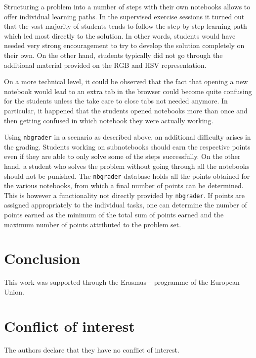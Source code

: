 \documentclass[twocolumn]{svjour3}          %
\begin{document}
Structuring a problem into a number of steps with their own notebooks allows to
offer individual learning paths. In the supervised exercise sessions it turned
out that the vast majority of students tends to follow the step-by-step
learning path which led most directly to the solution. In other words, students
would have needed very strong encouragement to try to develop the solution
completely on their own. On the other hand, students typically did not go through
the additional material provided on the RGB and HSV representation.

On a more technical level, it could be observed that the fact that opening a
new notebook would lead to an extra tab in the browser could become quite
confusing for the students unless the take care to close tabs not needed
anymore. In particular, it happened that the students opened notebooks more
than once and then getting confused in which notebook they were actually
working.

Using \texttt{nbgrader} in a scenario as described above, an additional
difficulty arises in the grading. Students working on subnotebooks should earn
the respective points even if they are able to only solve some of the steps
successfully. On the other hand, a student who solves the problem without going
through all the notebooks should not be punished. The \texttt{nbgrader}
database holds all the points obtained for the various notebooks, from which a
final number of points can be determined. This is however a functionality not
directly provided by \texttt{nbgrader}. If points are assigned appropriately to
the individual tasks, one can determine the number of points earned as the
minimum of the total sum of points earned and the maximum number of points
attributed to the problem set.

\section{Conclusion}





\begin{acknowledgements}
This work was supported through the Erasmus+ programme of the
European Union.
\end{acknowledgements}




\section*{Conflict of interest}
The authors declare that they have no conflict of interest.
\end{document}
